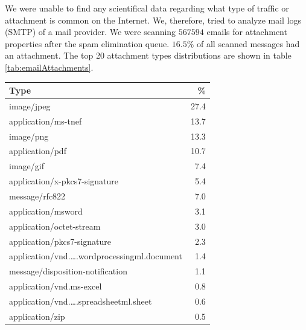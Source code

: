We were unable to find any scientifical data regarding what type of traffic or attachment is common on the Internet. We, therefore, tried to analyze mail logs (SMTP) of a mail provider. We were scanning $567594$ emails for attachment properties after the spam elimination queue. $16.5\%$ of all scanned messages had an attachment. The top 20 attachment types distributions are shown in table \ref{tab:emailAttachments}.
\begin{table}[ht]
	
	\begin{tabular}{l|r}\hline
		Type                                                                        & \%\\\hline
		image/jpeg                                                                  &    27.4\\
		application/ms-tnef                                                         &    13.7\\
		image/png                                                                   &    13.3\\
		application/pdf                                                             &    10.7\\
		image/gif                                                                   &    7.4\\
		application/x-pkcs7-signature                                               &    5.4\\
		message/rfc822                                                              &    7.0\\
		application/msword                                                          &    3.1\\
		application/octet-stream                                                    &    3.0\\
		application/pkcs7-signature                                                 &    2.3\\
		application/vnd.\ldots.wordprocessingml.document                            &     1.4\\
		message/disposition-notification                                            &    1.1\\
		application/vnd.ms-excel                                                    &    0.8\\
		application/vnd.\ldots.spreadsheetml.sheet                                  &    0.6\\
		application/zip                                                             &    0.5\\

\end{tabular}
\end{table}
